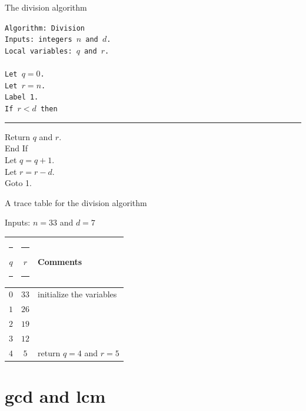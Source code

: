 \documentclass[landscape]{beamer}
\begin{document}
\begin{frame}{The division algorithm}
\begin{center}
\begin{minipage}[b]{.5\textwidth}
\tt Algorithm: Division\\
Inputs: integers $n$ and $d$.\\
Local variables: $q$ and $r$.\\
\\
Let $q = 0$. \\
Let $r = n$. \\
Label 1.\\
If $r < d$ then\\
\rule{15pt}{0pt} Return $q$ and $r$.\\
End If\\
Let $q = q + 1$.\\
Let $r = r - d$.\\
Goto 1. \\
\end{minipage}
\end{center}
\end{frame}

\begin{frame}{A trace table for the division algorithm}
\begin{center}
Inputs: $n=33$ and $d=7$ \newline

\vspace{.1in}

\begin{tabular}{c|c|l} 
\rule[-6pt]{0pt}{24pt} \rule{12pt}{0pt} $q$ \rule{12pt}{0pt} & \rule{12pt}{0pt} $r$ \rule{12pt}{0pt} & Comments \\ \hline
\rule[-6pt]{0pt}{24pt}$0$ & $33$ & initialize the variables\\
\rule[-6pt]{0pt}{24pt}$1$ & $26$ & \\
\rule[-6pt]{0pt}{24pt}$2$ & $19$ & \\
\rule[-6pt]{0pt}{24pt}$3$ & $12$ & \\
\rule[-6pt]{0pt}{24pt}$4$ & $5$ & return $q=4$ and $r=5$ \\
\end{tabular}
\end{center}
\end{frame}

\section{gcd and lcm}
\end{document}
